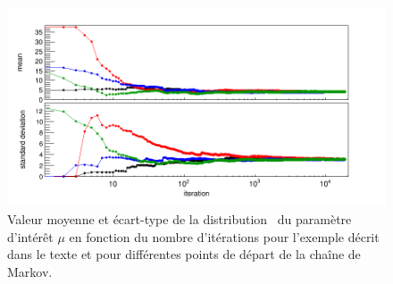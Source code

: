 \begin{figure}[!htb]
\begin{center}
\hspace*{-0.6cm}
\includegraphics[scale=0.45]{macros/cMu.png}
\caption{Valeur moyenne et \'ecart-type de la distribution \posterior~du param\`etre d'int\'er\^et $\mu$ en fonction du nombre d'it\'erations pour l'exemple d\'ecrit dans le texte et pour différentes points de départ de la cha\^ine de Markov.\label{fig:illustrationConvergeMarkovChainMu}}
\end{center}
\end{figure}




